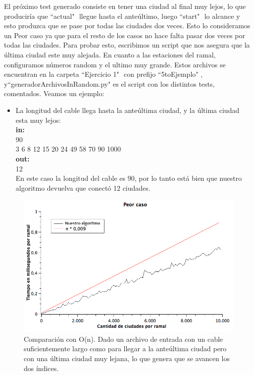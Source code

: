 El próximo test generado consiste en tener una ciudad al final muy lejos, lo que produciría que ``actual" $ $ llegue hasta el anteúltimo, luego ``start" $ $  lo alcance y esto produzca que se pase por todas las ciudades dos veces. Esto lo consideramos un Peor caso ya que para el resto de los casos no hace falta pasar dos veces por todas las ciudades.  Para probar esto, escribimos un script que nos asegura que la última ciudad este muy alejada. En cuanto a las estaciones del ramal, configuramos números random y el ultimo muy grande. Estos archivos se encuentran en la carpeta ``Ejercicio 1" $ $ con prefijo ``5toEjemplo" $ $, y``generadorArchivosInRandom.py" $ $es el script con los distintos tests, comentados. Veamos un ejemplo:\\

\begin{itemize}
\item La longitud del cable llega hasta la anteúltima ciudad, y la última ciudad esta muy lejos:\\
\textbf{in:}\\
90\\
3 6 8 12 15 20 24 49 58 70 90 1000 \\
\textbf{out:}\\
12\\

En este caso la longitud del cable es 90, por lo tanto está bien que nuestro algoritmo devuelva que conectó 12 ciudades.\\
\end{itemize}

\begin{figure}[H]
\begin{center}

  \includegraphics[width=\linewidth]{../graficos/ej1/PeorCaso.png}
  \caption{{\small Comparación con O(n). Dado un archivo de entrada con un cable suficientemente largo como para llegar a la anteúltima ciudad pero con una última ciudad muy lejana, lo que genera que se avancen los dos índices.}} \label{ej1-peor}
\endminipage

\end{center}
\end{figure}

